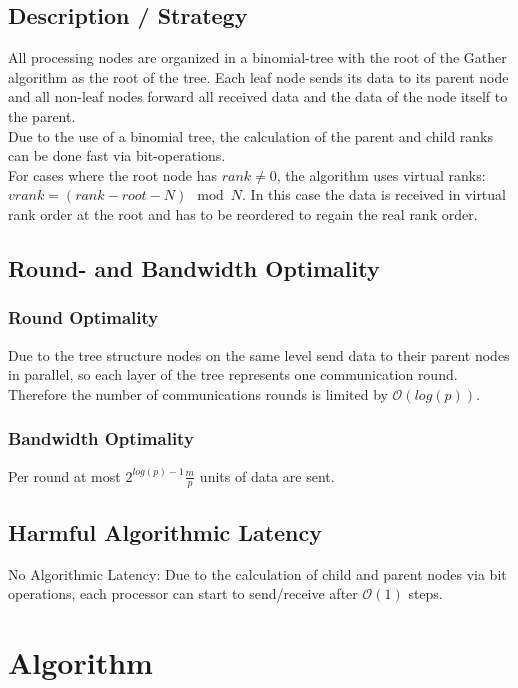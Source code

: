 \subsection{Description / Strategy}

All processing nodes are organized in a binomial-tree with the root of the Gather algorithm as the root of the tree. Each leaf node sends its data to its parent node and all non-leaf nodes forward all received data and the data of the node itself to the parent. \\
Due to the use of a binomial tree, the calculation of the parent and child ranks can be done fast via bit-operations.\\

For cases where the root node has $rank \neq 0$, the algorithm uses virtual ranks:
$vrank = (rank - root - N ) \mod N$. In this case the data is received in virtual rank order at the root and has to be reordered to regain the real rank order.

\subsection{Round- and Bandwidth Optimality}

\subsubsection{Round Optimality}
Due to the tree structure nodes on the same level send data to their parent nodes in parallel, so each layer of the tree represents one communication round. Therefore the number of communications rounds is limited by $\mathcal{O}(log(p))$.

\subsubsection{Bandwidth Optimality}
Per round at most $2^{log(p)-1} \frac{m}{p}$ units of data are sent. %

\subsection{Harmful Algorithmic Latency}
No Algorithmic Latency: Due to the calculation of child and parent nodes via bit operations, each processor can start to send/receive after $\mathcal{O}(1)$ steps.


\section{Algorithm \myscatter}

